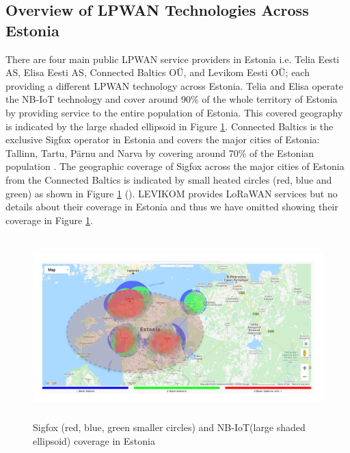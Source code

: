 \documentclass[12pt]{article}
\begin{document}
\subsection{Overview of LPWAN Technologies Across Estonia} \label{Overview of LPWAN in Estonia}

There are four main public LPWAN service providers in Estonia i.e. Telia Eesti AS, Elisa Eesti AS, Connected Baltics OÜ, and Levikom Eesti OÜ; each providing a different LPWAN technology across Estonia. Telia and Elisa operate the NB-IoT technology and cover around 90\% of the whole territory of Estonia by providing service to the entire population of Estonia. This covered geography is indicated by the large shaded ellipsoid in Figure \ref{fig:Overview of coverage of NB-IoT and Sigfox in Estonia}. Connected Baltics is the exclusive Sigfox operator in Estonia and covers the major cities of Estonia: Tallinn, Tartu, Pärnu and Narva by covering around 70\% of the Estonian population \cite{connected}. The geographic coverage of Sigfox across the major cities of Estonia from the Connected Baltics is indicated by small heated circles (red, blue and green) as shown in Figure \ref{fig:Overview of coverage of NB-IoT and Sigfox in Estonia} (\cite{connected}). LEVIKOM \cite{levikom} provides LoRaWAN services but no details about their coverage in Estonia and thus we have omitted showing their coverage in Figure \ref{fig:Overview of coverage of NB-IoT and Sigfox in Estonia}. \par \begin{figure}[H]
    \centering
    \includegraphics[width=0.9\columnwidth,height=7cm, keepaspectratio]{Images/coverage.pdf}
    \caption{Sigfox (red, blue, green smaller circles) and NB-IoT(large shaded ellipsoid) coverage in Estonia}
    \label{fig:Overview of coverage of NB-IoT and Sigfox in Estonia}
\end{figure}
\end{document}
